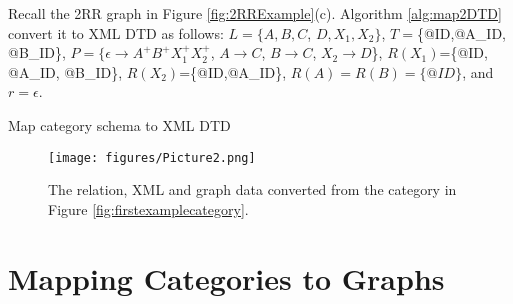 \begin{example} Recall the 2RR graph in Figure \ref{fig:2RRExample}(c).
Algorithm \ref{alg:map2DTD} convert it to XML DTD as follows: $L=\{A,B,C$, $D,X_1,X_2\}$, $T=$\{@ID,@A\_ID, @B\_ID\}, $P=\{\epsilon \to A^+B^+X_1^+X_2^+$, $A \to  C$, $B \to C$, $X_2 \to D$\}, $R(X_1)$=\{@ID, @A\_ID, @B\_ID\}, $R(X_2)$=\{@ID,@A\_ID\}, $R(A)=R(B)=\{@ID\}$, and $r = \epsilon$.  
\end{example}

\begin{algorithm} \caption{Map  category schema to XML DTD}\label{alg:map2DTD}\end{algorithm}





 



\begin{figure*}
\centering
\texttt{[image: figures/Picture2.png]}
\caption{The relation, XML and graph data converted from the category in Figure \ref{fig:firstexamplecategory}.} \label{fig:relationXML}
\end{figure*}



\section{Mapping Categories to Graphs}
\label{sec:PropertyGraph}

